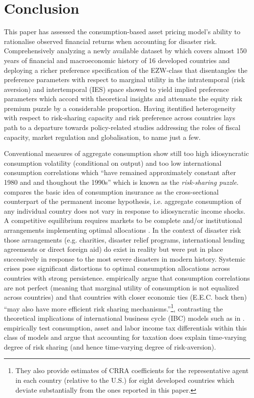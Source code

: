 \section{Conclusion} \label{Conclusion}

This paper has assessed the consumption-based asset pricing model's ability to rationalise observed financial returns when accounting for disaster risk. Comprehensively analyzing a newly available dataset by \citet{Jorda2017} which covers almost 150 years of financial and macroeconomic history of 16 developed countries and deploying a richer preference specification of the EZW-class that disentangles the preference parameters with respect to marginal utility in the intratemporal (risk aversion) and intertemporal (IES) space showed to yield implied preference parameters which accord with theoretical insights and attenuate the equity risk premium puzzle by a considerable proportion. Having itentified heterogeneity with respect to risk-sharing capacity and risk preference across countries lays path to a departure towards policy-related studies addressing the roles of fiscal capacity, market regulation and globalisation, to name just a few.


Conventional measures of aggregate consumption show still too high idiosyncratic consumption volatility (conditional on output) and too low international consumption correlations which ``have remained approximately constant after 1980 and and thoughout the 1990s'' \cite{Artis2008} which is known as the \textit{risk-sharing puzzle}.
\citet{Cochrane1991} compares the basic idea of consumption insurance as the cross-sectional counterpart of the permanent income hypothesis, i.e. aggregate consumption of any individual country does not vary in response to idiosyncratic income shocks. A competitive equilibrium requires markets to be complete and/or institutional arrangements implementing optimal allocations \cite{Canova1996}. In the context of disaster risk those arrangements (e.g. charities, disaster relief programs, international lending agreements or direct foreign aid) do exist in reality but were put in place successively in response to the most severe disasters in modern history. Systemic crises pose significant distortions to optimal consumption allocations across countries with strong persistence. \citet{Canova1996} empirically argue that consumption correlations are not perfect (meaning that marginal utility of consumption is not equalized across countries) and that countries with closer economic ties (E.E.C. back then) ``may also have more efficient risk sharing mechanisms.''\footnote{They also provide estimates of CRRA coefficients for the representative agent in each country (relative to the U.S.) for eight developed countries which deviate substantially from the ones reported in this paper.}, contrasting the theoretical implications of international business cycle (IBC) models such as in \citet{Backus1992}. \citet{Epstein2016} empirically test consumption, asset and labor income tax differentials within this class of models and argue that accounting for taxation does explain time-varying degree of risk sharing (and hence time-varying degree of risk-aversion).

